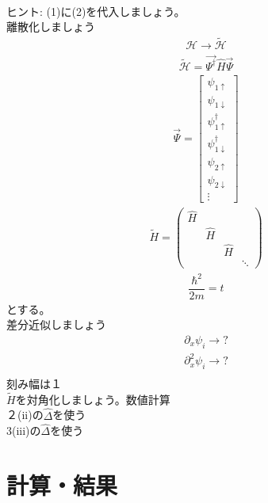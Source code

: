 \documentclass{jarticle}
\begin{document}
\\ ヒント: (1)に(2)を代入しましょう。\\
離散化しましょう\\
\begin{align}
\mathcal{H}\rightarrow \tilde{\mathcal{H}}
\end{align}
\begin{align}
\tilde{\mathcal{H}}=\vec{\Psi^{\dagger}}\hat{H}\vec{\Psi}	
\end{align}
\begin{align}
\vec{\Psi}=\begin{bmatrix}
\psi_{1\uparrow} \\
\psi_{1\downarrow} \\
\psi_{1\uparrow}^\dagger \\
\psi_{1\downarrow}^\dagger\\
\psi_{2\uparrow} \\
\psi_{2\downarrow} \\
\vdots
\end{bmatrix}
\end{align}
\begin{align}
\tilde{H}=
\begin{pmatrix}
\hat{H} &  &  &  \\
& \hat{H} &  &  \\
&  & \hat{H} &  \\
&  &  & \ddots
\end{pmatrix}
\end{align}
\begin{align}
\dfrac{\hbar^2}{2m}=t
\end{align}
とする。\\
差分近似しましょう\\
\begin{align}
\partial_x \psi_i\rightarrow?\\
\partial^2_x \psi_i\rightarrow?\\
\end{align}
刻み幅は$１$\\
$\tilde{H}$を対角化しましょう。数値計算\\
２(ii)の$\hat{\Delta}$を使う\\
3(iii)の$\hat{\Delta}$を使う\\

\section{計算・結果}
\end{document}
